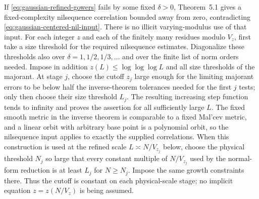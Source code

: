 If \eqref{eq:gaussian-refined-gowers} fails by some fixed $\delta>0$,
Theorem~5.1 gives a fixed-complexity nilsequence correlation bounded
away from zero, contradicting \eqref{eq:gaussian-centered-nil-input}.
There is no illicit varying-modulus use of that input. For each integer
$z$ and each of the finitely many residues modulo $V_z$, first take a
size threshold for the required nilsequence estimates. Diagonalize
these thresholds also over $\delta=1,1/2,1/3,\ldots$ and over the finite
list of norm orders needed. Impose in addition
$z(L)\leq\log\log\log L$ and all size thresholds of the majorant.
At stage $j$, choose the cutoff $z_j$ large enough for the limiting
majorant errors to be below half the inverse-theorem tolerances needed
for the first $j$ tests; only then choose their size threshold $L_j$.
The resulting increasing step function tends to infinity and proves
the assertion for all sufficiently large $L$. The fixed smooth metric
in the inverse theorem is comparable to a fixed Mal'cev metric, and a
linear orbit with arbitrary base point is a polynomial orbit, so the
nilsequence input applies to exactly the supplied correlations.
When this construction is used at the refined scale $L\asymp N/V_{z_j}$
below, choose the physical threshold $N_j$ so large that every constant
multiple of $N/V_{z_j}$ used by the normal-form reduction is at least
$L_j$ for $N\geq N_j$. Impose the same growth constraints there.
Thus the cutoff is constant on each physical-scale stage; no implicit
equation $z=z(N/V_z)$ is being assumed.

